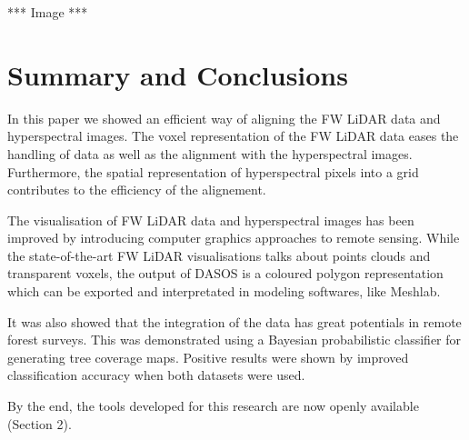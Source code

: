 \documentclass{subfiles}
\begin{document}
*** Image *** 

\section {Summary and Conclusions}
\par In this paper we showed an efficient way of aligning the FW LiDAR data and hyperspectral images. The voxel representation of the FW LiDAR data eases the handling of data as well as the alignment with the hyperspectral images. Furthermore, the spatial representation of hyperspectral pixels into a grid
contributes to the efficiency of the alignement.

\par The visualisation of FW LiDAR data and hyperspectral images has been improved by introducing computer graphics approaches to remote sensing. While the state-of-the-art FW LiDAR visualisations talks about points clouds and transparent
voxels, the output of DASOS is a coloured polygon representation which can be exported and interpretated in modeling softwares, like Meshlab.

\par It was also showed that the integration of the data has great potentials in remote forest surveys. This was demonstrated using a Bayesian probabilistic classifier for generating tree coverage maps. Positive results were shown by improved classification accuracy when both datasets were used.

\par By the end, the tools developed for this research are now openly available (Section 2). 
\end{document}

